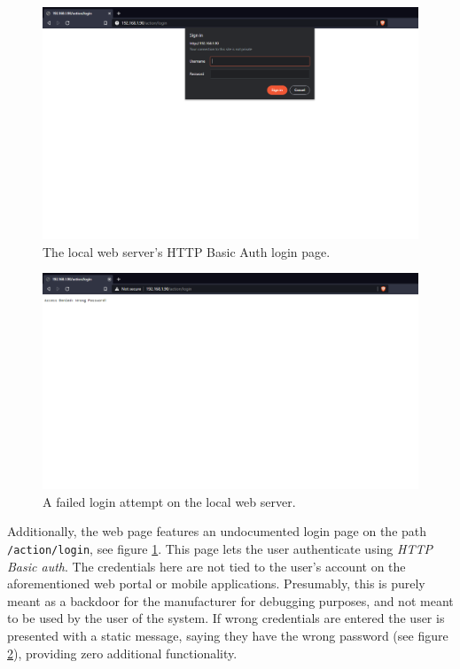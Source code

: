 \begin{figure}[!ht]
    \centering
    \includegraphics[width=\textwidth]{images/3-system/local-login-page.png}
    \caption{The local web server's HTTP Basic Auth login page.}
    \label{fig:local-login-page}
\end{figure}
\begin{figure}[!ht]
    \centering
    \includegraphics[width=\textwidth]{images/3-system/local-login-denied.png}
    \caption{A failed login attempt on the local web server.}
    \label{fig:local-login-denied}
\end{figure}
Additionally, the web page features an undocumented login page on the path \texttt{/action/login}, see figure \ref{fig:local-login-page}. This page lets the user authenticate using \textit{HTTP Basic auth}. The credentials here are not tied to the user's account on the aforementioned web portal or mobile applications. Presumably, this is purely meant as a backdoor for the manufacturer for debugging purposes, and not meant to be used by the user of the system. If wrong credentials are entered the user is presented with a static message, saying they have the wrong password (see figure \ref{fig:local-login-denied}), providing zero additional functionality.
